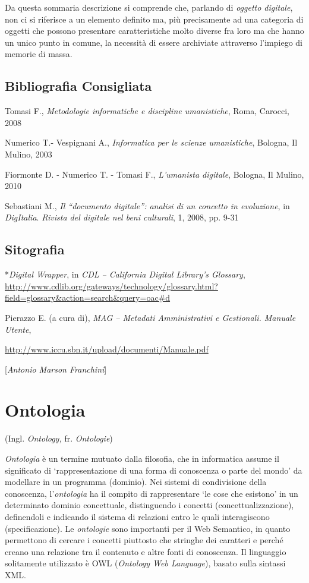{Da questa sommaria descrizione si comprende che, parlando di
\emph{oggetto digitale}, non ci si riferisce a un elemento definito ma,
più precisamente ad una categoria di oggetti che possono presentare
caratteristiche molto diverse fra loro ma che hanno un unico punto in
comune, la necessità di essere archiviate attraverso l'impiego di
memorie di massa.

\section*{Bibliografia Consigliata}
{\parindent0pt 
Tomasi F., \emph{Metodologie informatiche e discipline umanistiche},
Roma, Carocci, 2008

Numerico T.- Vespignani A., \emph{Informatica per le scienze
umanistiche}, Bologna, Il Mulino, 2003

Fiormonte D. - Numerico T. - Tomasi F., \emph{L'umanista digitale},
Bologna, Il Mulino, 2010

Sebastiani M., \emph{Il ``documento digitale'': analisi di un concetto
in evoluzione}, in \emph{DigItalia}. \emph{Rivista del digitale nel beni
culturali}, 1, 2008, pp. 9-31
}

\section*{Sitografia}
{\parindent0pt 
*\emph{Digital Wrapper}, in \emph{CDL -- California Digital Library's
Glossary},
\url{http://www.cdlib.org/gateways/technology/glossary.html?field=glossary\&action=search\&query=oac\#d}

Pierazzo E. (a cura di), \emph{MAG -- Metadati Amministrativi e
Gestionali. Manuale Utente},

\url{http://www.iccu.sbn.it/upload/documenti/Manuale.pdf}
}

\hrulefill 

{[}\emph{Antonio Marson Franchini}{]}



\chapter{Ontologia}

(Ingl. \emph{Ontology,} fr. \emph{Ontologie})

\emph{Ontologia} è un termine mutuato dalla filosofia, che in
informatica assume il significato di `rappresentazione di una forma di
conoscenza o parte del mondo' da modellare in un programma (dominio).
Nei sistemi di condivisione della conoscenza, l'\emph{ontologia} ha il
compito di rappresentare `le cose che esistono' in un determinato
dominio concettuale, distinguendo i concetti (concettualizzazione),
definendoli e indicando il sistema di relazioni entro le quali
interagiscono (specificazione). Le \emph{ontologie} sono importanti per
il Web Semantico, in quanto permettono di cercare i concetti piuttosto
che stringhe dei caratteri e perché creano una relazione tra il
contenuto e altre fonti di conoscenza. Il linguaggio solitamente
utilizzato è OWL (\emph{Ontology Web Language}), basato sulla sintassi
XML.

}
